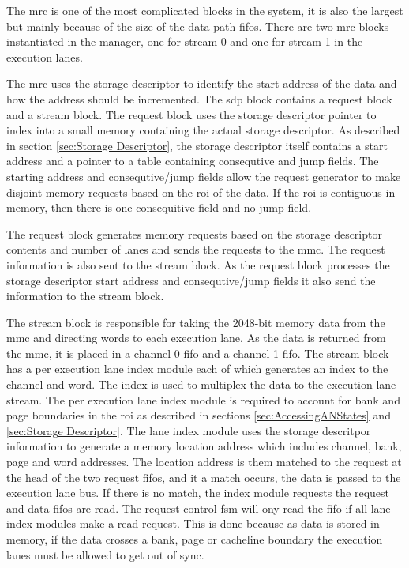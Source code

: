 The \ac{mrc} is one of the most complicated blocks in the system, it is also the largest but mainly because of the size of the data path \acp{fifo}.
There are two \ac{mrc} blocks instantiated in the manager, one for stream 0 and one for stream 1 in the execution lanes.

The \ac{mrc} uses the storage descriptor to identify the start address of the data and how the address should be incremented.
The \ac{sdp} block contains a request block and a stream block.
The request block uses the storage descriptor pointer to index into a small memory containing the actual storage descriptor. 
As described in section \ref{sec:Storage Descriptor}, the storage descriptor itself contains a start address and a pointer to a table containing consequtive and jump fields.
The starting address and consequtive/jump fields allow the request generator to make disjoint memory requests based on the \ac{roi} of the data. 
If the \ac{roi} is contiguous in memory, then there is one consequitive field and no jump field.

The request block generates memory requests based on the storage descriptor contents and number of lanes and sends the requests to the \ac{mmc}.
The request information is also sent to the stream block.
As the request block processes the storage descriptor start address and consequtive/jump fields it also send the information to the stream block.

The stream block is responsible for taking the 2048-bit memory data from the \ac{mmc} and directing words to each execution lane.
As the data is returned from the \ac{mmc}, it is placed in a channel 0 \ac{fifo} and a channel 1 \ac{fifo}. 
The stream block has a per execution lane index module each of which generates an index to the channel and word.
The index is used to multiplex the data to the execution lane stream.
The per execution lane index module is required to account for bank and page boundaries in the \ac{roi} as described in sections \ref{sec:AccessingANStates} and \ref{sec:Storage Descriptor}.
The lane index module uses the storage descritpor information to generate a memory location address which includes channel, bank, page and word addresses.
The location address is them matched to the request at the head of the two request \acp{fifo}, and it a match occurs, the data is passed to the execution lane bus.
If there is no match, the index module requests the request and data \acp{fifo} are read. The request control \ac{fsm} will ony read the \ac{fifo} if all lane index modules make a read request.
This is done because as data is stored in memory, if the data crosses a bank, page or cacheline boundary the execution lanes must be allowed to get out of sync.


